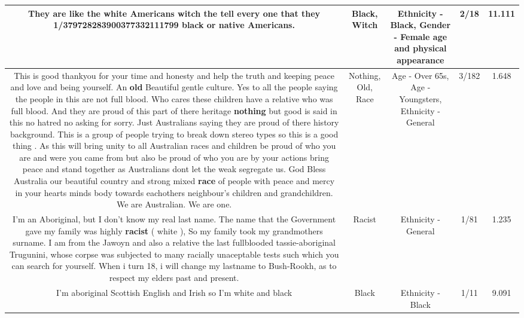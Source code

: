 \documentclass[11pt]{article}
\newlength\mylength
\begin{document}
\begin{center}
\begin{longtable}{|C{.65\mylength}|C{.30\mylength}|C{.12\mylength}|C{.12\mylength}|C{.12\mylength}|}
  \small They are like the white Americans \textbf{witch} the tell every one that they 1/379728283900377332111799 \textbf{black} or native Americans.\normalsize   & Black, Witch & Ethnicity - Black, Gender - Female age and physical appearance & 2/18 & 11.111 \\  \hline
  \small This is good thankyou for your time and honesty and help the truth and keeping peace and love and being yourself. An \textbf{old} Beautiful gentle culture. Yes to all the people saying the people in this are not full blood. Who cares these children  have a relative who was full blood. And they are proud of this part of there heritage \textbf{nothing} but good is said in this no hatred no asking for sorry.  Just Australians saying they are proud of there history background. This is a group of people trying to break down stereo types so this is a good thing . As this will bring unity to all Australian races and children be proud of who you are and were you came from but also be proud of who you are by your actions bring peace and stand together as Australians dont let the weak segregate us. God Bless Australia our beautiful country and strong mixed \textbf{race} of people with peace and mercy in your hearts minds body towards eachothers neighbour's children and grandchildren. We are Australian. We are one.\normalsize   & Nothing, Old, Race & Age - Over 65s, Age - Youngsters, Ethnicity - General & 3/182 & 1.648 \\  \hline
  \small I'm an Aboriginal, but I don't know my real last name. The name that the Government gave my family was highly \textbf{racist} ( white ), So my family took my grandmothers surname. I am from the Jawoyn and also a relative the last fullblooded tassie-aboriginal Trugunini, whose corpse was subjected to many racially unaceptable tests such which you can search for yourself. When i turn 18, i will change my lastname to Bush-Rookh, as to respect my elders past and present.\normalsize   & Racist & Ethnicity - General & 1/81 & 1.235 \\  \hline
  \small I'm aboriginal Scottish English and Irish so I'm white and black\normalsize   & Black & Ethnicity - Black & 1/11 & 9.091 \\  \hline

\end{longtable}
\end{center}
\end{document}
